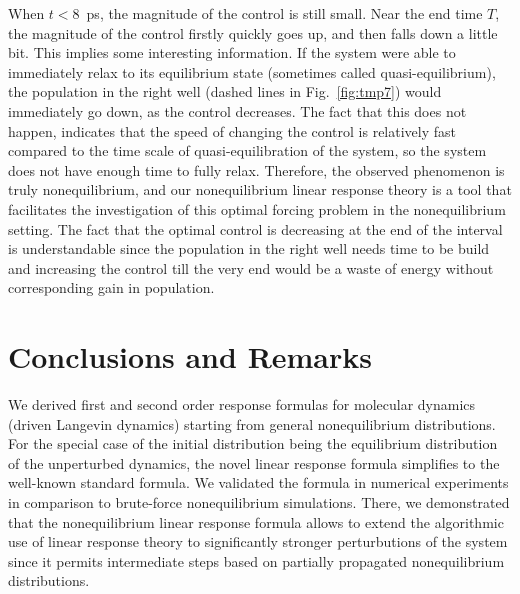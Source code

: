 \documentclass[]{tMPH2e}
\begin{document}
When $t<8$~\textsf{ps}, the magnitude of the control is still small.  Near the end time $T$, the magnitude of the control firstly
quickly goes up, and then falls down a little bit.  This implies some
interesting information.  If the system were able to immediately relax
to its equilibrium state (sometimes called
quasi-equilibrium), the population in the right well (dashed lines in
Fig.~\ref{fig:tmp7}) would immediately go down, as the control
decreases.  The fact that this does not happen, indicates that the
speed of changing the control is relatively fast compared to the 
time scale of quasi-equilibration of the system, so the system does not have enough time to
fully relax. Therefore, the observed phenomenon is truly
nonequilibrium, and our nonequilibrium linear response theory is a
tool that facilitates the investigation of this optimal forcing
problem in the nonequilibrium setting. The fact that the optimal control is decreasing at the end of the interval is understandable since the population in the right well needs time to be build and increasing the control till the very end would be a waste of energy without corresponding gain in population.

 





\section{Conclusions and Remarks}

We derived  first and second order response formulas for molecular dynamics (driven Langevin dynamics) starting from general nonequilibrium distributions. For the special case of the initial distribution being the equilibrium distribution of the unperturbed dynamics, the novel linear response formula simplifies to the well-known standard formula. We validated the  formula in numerical experiments in comparison to brute-force nonequilibrium simulations. There, we demonstrated that the nonequilibrium linear response formula allows to extend the algorithmic use of linear response theory to significantly stronger perturbutions of the system since it permits intermediate steps based on partially propagated nonequilibrium distributions. 
\end{document}
